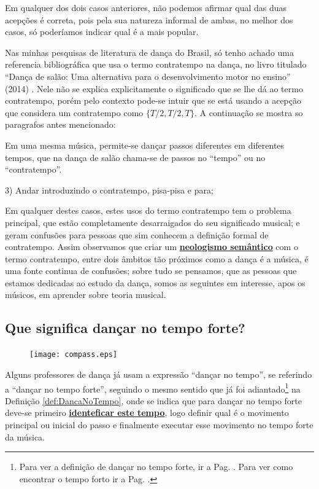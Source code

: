 Em qualquer dos dois casos anteriores, não podemos afirmar qual das duas acepções é correta,
pois pela sua natureza informal de ambas,
no melhor dos casos, só poderíamos indicar qual é a mais popular.

Nas minhas pesquisas de literatura de dança do Brasil, 
só tenho achado uma referencia bibliográfica que usa o termo contratempo na dança, 
no livro titulado ``Dança de salão: Uma alternativa para o desenvolvimento motor no ensino'' 
(2014) \cite[pp. 90, 211]{maia2014danca}.
Nele não se explica explicitamente o significado que se lhe dá ao termo contratempo,
porém pelo contexto pode-se intuir que se está usando a acepção
que considera um contratempo como $\{T/2,T/2,T\}$.
A continuação se mostra so paragrafos antes mencionado:
\begin{citando}
Em uma mesma música, permite-se dançar passos diferentes em diferentes tempos,
que na dança de salão chama-se de passos no ``tempo'' ou no ``contratempo''.
\end{citando}
\begin{citando}
3) Andar introduzindo o contratempo, pisa-pisa e para;
\end{citando}

Em qualquer destes casos, 
estes usos do termo contratempo tem o problema principal, 
que estão completamente desarraigados do seu significado musical;
e geram confusões para pessoas que sim conhecem a definição formal de contratempo.
Assim observamos que criar um 
\hyperref[def:NeologismoSemantico]{\textbf{neologismo semântico}} com o termo contratempo, 
entre dois âmbitos tão próximos como a dança é a música, é uma fonte continua de confusões;
sobre tudo se pensamos, que as pessoas que estamos dedicadas ao estudo da dança,
somos as seguintes em interesse, apos os músicos, em aprender sobre teoria musical.


\subsection{Que significa dançar no tempo forte?}
\label{subsec:dancatempoforte}

\begin{figure}
  \vspace{-10pt}
  \centering
    \texttt{[image: compass.eps]}
  \vspace{-10pt}
\end{figure}
Alguns professores de dança já usam a expressão ``dançar no tempo'', 
se referindo a ``dançar no tempo forte'', seguindo o mesmo sentido que já foi adiantado\footnote{Para 
ver a definição de dançar no tempo forte, ir a Pag. \pageref{def:DancaNoTempo}.
Para ver como encontrar o tempo forto ir a Pag. \pageref{subsec:perceberTF1}.}
 na Definição \ref{def:DancaNoTempo},
onde se indica que para dançar no tempo forte deve-se primeiro 
\hyperref[subsec:perceberTF1]{\textbf{identeficar este tempo}}, logo definir
 qual é o movimento principal ou inicial do passo
e finalmente executar esse movimento no tempo forte da música.

